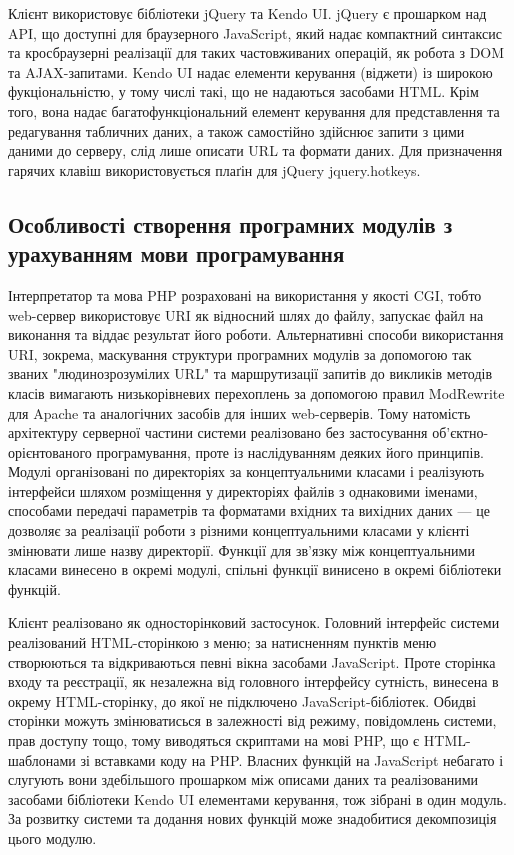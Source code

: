 Клієнт використовує бібліотеки jQuery та Kendo UI. jQuery є прошарком над API, що доступні для браузерного JavaScript, який надає компактний синтаксис та кросбраузерні реалізації для таких частовживаних операцій, як робота з DOM та AJAX-запитами. Kendo UI надає елементи керування (віджети) із широкою фукціональністю, у тому числі такі, що не надаються засобами HTML. Крім того, вона надає багатофункціональний елемент керування для представлення та редагування табличних даних, а також самостійно здійснює запити з цими даними до серверу, слід лише описати URL та формати даних. Для призначення гарячих клавіш використовується плаґін для jQuery jquery.hotkeys.

\subsection{Особливості створення програмних модулів з урахуванням мови програмування}
Інтерпретатор та мова PHP розраховані на використання у якості CGI, тобто web-сервер використовує URI як відносний шлях до файлу, запускає файл на виконання та віддає результат його роботи. Альтернативні способи використання URI, зокрема, маскування структури програмних модулів за допомогою так званих "людинозрозумілих URL" та маршрутизації запитів до викликів методів класів вимагають низькорівневих перехоплень за допомогою правил ModRewrite для Apache та аналогічних засобів для інших web-серверів. Тому натомість архітектуру серверної частини системи реалізовано без застосування об'єктно-орієнтованого програмування, проте із наслідуванням деяких його принципів. Модулі організовані по директоріях за концептуальними класами і реалізують інтерфейси шляхом розміщення у директоріях файлів з однаковими іменами, способами передачі параметрів та форматами вхідних та вихідних даних --- це дозволяє за реалізації роботи з різними концептуальними класами у клієнті змінювати лише назву директорії. Функції для зв'язку між концептуальними класами винесено в окремі модулі, спільні функції винисено в окремі бібліотеки функцій.

Клієнт реалізовано як односторінковий застосунок. Головний інтерфейс системи реалізований HTML-сторінкою з меню; за натисненням пунктів меню створюються та відкриваються певні вікна засобами JavaScript. Проте сторінка входу та реєстрації, як незалежна від головного інтерфейсу сутність, винесена в окрему HTML-сторінку, до якої не підключено JavaScript-бібліотек. Обидві сторінки можуть змінюватисься в залежності від режиму, повідомлень системи, прав доступу тощо, тому виводяться скриптами на мові PHP, що є HTML-шаблонами зі вставками коду на PHP. Власних функцій на JavaScript небагато і слугують вони здебільшого прошарком між описами даних та реалізованими засобами бібліотеки Kendo UI елементами керування, тож зібрані в один модуль. За розвитку системи та додання нових функцій може знадобитися декомпозиція цього модулю.

